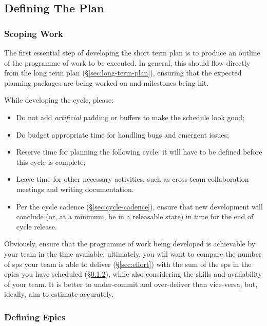 \subsection{Defining The Plan}

\subsubsection{Scoping Work}

The first essential step of developing the short term plan is to produce an outline of the programme of work to be executed.
In general, this should flow directly from the long term plan (\S\ref{sec:long-term-plan}), ensuring that the expected planning packages are being worked on and milestones being hit.

While developing the \gls{cycle}, please:

\begin{itemize}
\item
  Do not add \emph{artificial} padding or buffers to make the schedule look good;
\item
  Do budget appropriate time for handling bugs and emergent issues;
\item
  Reserve time for planning the following \gls{cycle}: it will have to be defined before this \gls{cycle} is complete;
\item
  Leave time for other necessary activities, such as cross-team collaboration meetings and writing documentation.
\item
  Per the \gls{cycle} cadence (\S\ref{sec:cycle-cadence}), ensure that new development will conclude (or, at a minimum, be in a releasable state) in time for the end of \gls{cycle} release.
\end{itemize}

Obviously, ensure that the programme of work being developed is achievable by your team in the time available: ultimately, you will want to compare the number of \glspl{sp} your team is able to deliver (\S\ref{sec:effort}) with the sum of the \glspl{sp} in the \glspl{epic} you have scheduled (\S\ref{sec:planning-epics}), while also considering the skills and availability of your team.
It is better to under-commit and over-deliver than vice-versa, but, ideally, aim to estimate accurately.

\subsubsection{Defining Epics}
\label{sec:planning-epics}

